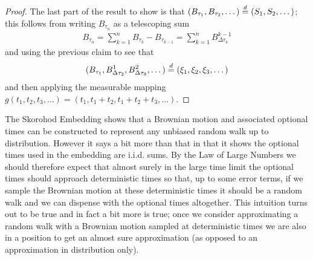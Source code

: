 \begin{proof}
The last part of the result to show is that $(B_{\tau_1},B_{\tau_2},
\dotsc) \overset{d}= (S_1, S_2, \dotsc)$;
this follows from writing $B_{\tau_n}$ as a telescoping sum
\begin{align*}
B_{\tau_n} = \sum_{k=1}^n B_{\tau_k} - B_{\tau_{k-1}} = \sum_{k=1}^n
B^{k-1}_{\Delta \tau_k}
\end{align*}
and using the previous claim to see that 
\begin{align*}
(B_{\tau_1},B^1_{\Delta \tau_2}, B^2_{\Delta \tau_3}, \dotsc) \overset{d}= (\xi_1,
\xi_2, \xi_3, \dotsc)
\end{align*} and then applying the measurable mapping $g(t_1, t_2,t_3,
\dotsc) = (t_1, t_1+t_2, t_1+t_2+t_3, \dotsc)$.
\end{proof}

The Skorohod Embedding shows that a Brownian motion and associated
optional times can be constructed
to represent any unbiased random walk up to distribution.  However it
says a bit more than that in that it shows the optional times used in
the embedding are i.i.d. sums.  By the Law of Large Numbers we should
therefore expect that almost surely in the large time limit the
optional times should approach deterministic times so that, up to some
error terms, if we sample the Brownian motion at these deterministic
times it should be a random walk and we can dispense with the optional
times altogether.  This intuition turns out to be true and in fact a
bit more is true; once we consider approximating a random walk with a
Brownian motion sampled at deterministic times we are also in a
position to get an almost sure approximation (as opposed to an
approximation in distribution only).

